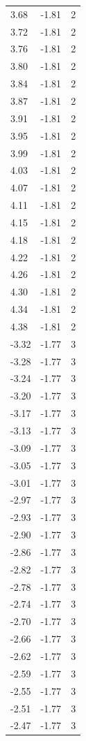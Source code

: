 \begin{longtable}{lrr}
  3.68 & -1.81 & 2 \\
  3.72 & -1.81 & 2 \\
  3.76 & -1.81 & 2 \\
  3.80 & -1.81 & 2 \\
  3.84 & -1.81 & 2 \\
  3.87 & -1.81 & 2 \\
  3.91 & -1.81 & 2 \\
  3.95 & -1.81 & 2 \\
  3.99 & -1.81 & 2 \\
  4.03 & -1.81 & 2 \\
  4.07 & -1.81 & 2 \\
  4.11 & -1.81 & 2 \\
  4.15 & -1.81 & 2 \\
  4.18 & -1.81 & 2 \\
  4.22 & -1.81 & 2 \\
  4.26 & -1.81 & 2 \\
  4.30 & -1.81 & 2 \\
  4.34 & -1.81 & 2 \\
  4.38 & -1.81 & 2 \\
  -3.32 & -1.77 & 3 \\
  -3.28 & -1.77 & 3 \\
  -3.24 & -1.77 & 3 \\
  -3.20 & -1.77 & 3 \\
  -3.17 & -1.77 & 3 \\
  -3.13 & -1.77 & 3 \\
  -3.09 & -1.77 & 3 \\
  -3.05 & -1.77 & 3 \\
  -3.01 & -1.77 & 3 \\
  -2.97 & -1.77 & 3 \\
  -2.93 & -1.77 & 3 \\
  -2.90 & -1.77 & 3 \\
  -2.86 & -1.77 & 3 \\
  -2.82 & -1.77 & 3 \\
  -2.78 & -1.77 & 3 \\
  -2.74 & -1.77 & 3 \\
  -2.70 & -1.77 & 3 \\
  -2.66 & -1.77 & 3 \\
  -2.62 & -1.77 & 3 \\
  -2.59 & -1.77 & 3 \\
  -2.55 & -1.77 & 3 \\
  -2.51 & -1.77 & 3 \\
  -2.47 & -1.77 & 3 \\

\end{longtable}
